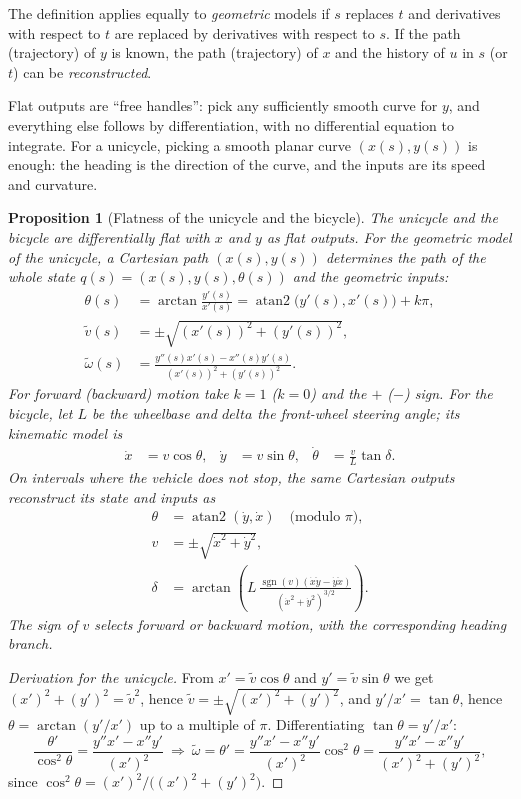 \documentclass[11pt,a4paper]{article}
\def\boldsymbol#1{#1}%
\DeclareMathOperator{\atan}{atan2}
\newcommand{\q}{\boldsymbol{q}}
\newcommand{\vt}{\tilde v}
\newcommand{\wt}{\tilde\omega}
\theoremstyle{definition}
\theoremstyle{plain}
\newtheorem{proposition}[definition]{Proposition}
\theoremstyle{remark}
\begin{document}
The definition applies equally to \emph{geometric} models if $s$ replaces $t$ and derivatives with respect to $t$ are
replaced by derivatives with respect to $s$. If the path (trajectory) of $\boldsymbol y$ is known, the path (trajectory) of
$\boldsymbol x$ and the history of $\boldsymbol u$ in $s$ (or $t$) can be \emph{reconstructed}.

\begin{intuition}
Flat outputs are ``free handles'': pick any sufficiently smooth curve for $\boldsymbol y$, and everything else follows by
differentiation, with no differential equation to integrate. For a unicycle, picking a smooth planar curve $(x(s),y(s))$ is
enough: the heading is the direction of the curve, and the inputs are its speed and curvature.
\end{intuition}

\begin{proposition}[Flatness of the unicycle and the bicycle]\label{prop:flatuni}
The unicycle and the bicycle are differentially flat with $x$ and $y$ as flat outputs. For the geometric model of the unicycle, a
Cartesian path $(x(s),y(s))$ determines the path of the whole state $\q(s)=(x(s),y(s),\theta(s))$ and the geometric inputs:
\begin{align}
\theta(s)&=\arctan\frac{y'(s)}{x'(s)}=\atan\big(y'(s),x'(s)\big)+k\pi,\\
\vt(s)&=\pm\sqrt{(x'(s))^2+(y'(s))^2},\\
\wt(s)&=\frac{y''(s)x'(s)-x''(s)y'(s)}{(x'(s))^2+(y'(s))^2}.
\end{align}
For forward (backward) motion take $k=1$ ($k=0$) and the $+$ ($-$) sign.
For the bicycle, let $L$ be the wheelbase and $delta$ the front-wheel steering angle; its kinematic model is
\begin{align*}
\dot x&=v\cos\theta, & \dot y&=v\sin\theta, &
\dot\theta&=\frac{v}{L}\tan\delta.
\end{align*}
On intervals where the vehicle does not stop, the same Cartesian outputs reconstruct its state and inputs as
\begin{align*}
\theta&=\operatorname{atan2}(\dot y,\dot x)\quad\text{(modulo $\pi$)},\\
v&=\pm\sqrt{\dot x^2+\dot y^2},\\
\delta&=\arctan\!\left(L\,\frac{\operatorname{sgn}(v)(\dot x\ddot y-\dot y\ddot x)}
                              {(\dot x^2+\dot y^2)^{3/2}}\right).
\end{align*}
The sign of $v$ selects forward or backward motion, with the corresponding heading branch.
\end{proposition}
\begin{proof}[Derivation for the unicycle]
From $x'=\vt\cos\theta$ and $y'=\vt\sin\theta$ we get $(x')^2+(y')^2=\vt^2$, hence $\vt=\pm\sqrt{(x')^2+(y')^2}$, and
$y'/x'=\tan\theta$, hence $\theta=\arctan(y'/x')$ up to a multiple of $\pi$. Differentiating $\tan\theta=y'/x'$:
\[
\frac{\theta'}{\cos^2\theta}=\frac{y''x'-x''y'}{(x')^2}\ \Longrightarrow\ 
\wt=\theta'=\frac{y''x'-x''y'}{(x')^2}\cos^2\theta=\frac{y''x'-x''y'}{(x')^2+(y')^2},
\]
since $\cos^2\theta=(x')^2/\big((x')^2+(y')^2\big)$. \qedhere
\end{proof}
\end{document}
